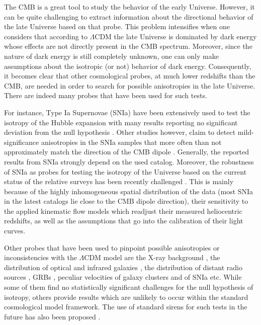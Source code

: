 \documentclass{aa}   %
\begin{document}
The CMB is a great tool to study the behavior of the early Universe. However, it can be quite challenging to extract information about the directional behavior of the late Universe based on that probe. This problem intensifies when one considers that according to $\Lambda$CDM the late Universe is dominated by dark energy whose effects are not directly present in the CMB spectrum. Moreover, since the nature of dark energy is still completely unknown, one can only make assumptions about the isotropic (or not) behavior of dark energy. Consequently, it becomes clear that other cosmological probes, at much lower redshifts than the CMB, are needed in order to search for possible anisotropies in the late Universe. There are indeed many probes that have been used for such tests.

For instance, Type Ia Supernovae (SNIa) have been extensively used to test the isotropy of the Hubble expansion with many results reporting no significant deviation from the null hypothesis \citep{lin,andrade,sun,wang}. Other studies however, claim to detect mild-significance anisotropies in the SNIa samples that more often than not approximately match the direction of the CMB dipole \citep{schwarz,antoniou,colin2011,mariano,kalus,appleby-john,bengaly15,javanm15,migkas,colin}. Generally, the reported results from SNIa strongly depend on the used catalog. Moreover, the robustness of SNIa as probes for testing the isotropy of the Universe based on the current status of the relative surveys has been recently challenged \citep{colin,jimenez,rameez2}. This is mainly because of the highly inhomogeneous spatial distribution of the data (most SNIa in the latest catalogs lie close to the CMB dipole direction), their sensitivity to the applied kinematic flow models which readjust their measured heliocentric redshifts, as well as the assumptions that go into the calibration of their light curves. 

Other probes that have been used to pinpoint possible anisotropies or inconsistencies with the $\Lambda$CDM model are the X-ray background \citep{shafer, plionis99}, the distribution of optical \citep{javanm17,sarkar} and infrared galaxies \citep{yoon,rameez}, the distribution of distant radio sources \citep{condon,blake,singal,rubart,tiwari,bengaly18,colin2,bengaly19}, GRBs \citep{ripa,andrade19}, peculiar velocities of galaxy clusters \citep{kashl08,kashl10,watkins,kash11,atrio-bar} and of SNIa \citep{appleby-john} etc.  While some of them find no statistically significant challenges for the null hypothesis of isotropy, others provide results which are unlikely to occur within the standard cosmological model framework. The use of standard sirens for such tests in the future has also been proposed \citep[e.g.,][]{cai}.
\end{document}
